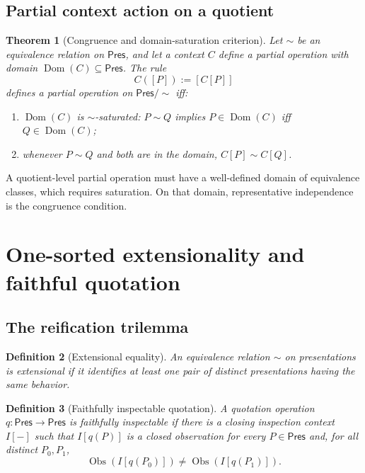 \documentclass[12pt,a4paper,twoside]{extarticle}
\makeatletter
\theoremstyle{compactplain}
\newtheorem{theorem}{Theorem}[section]
\theoremstyle{compactdef}
\newtheorem{definition}[theorem]{Definition}
\renewenvironment{proof}[1][\proofname]{\par\pushQED{\qed}\normalfont
  \topsep2pt\trivlist\item[\hskip\labelsep\bfseries #1\@addpunct{.}]\ignorespaces}
 {\popQED\endtrivlist\@endpefalse}
\newcommand{\Pres}{\mathsf{Pres}}
\newcommand{\blank}{[-]}
\makeatother
\begin{document}
\subsection{Partial context action on a quotient}
\begin{theorem}[Congruence and domain-saturation criterion]\label{thm:partial-congruence}
Let $\sim$ be an equivalence relation on $\Pres$, and let a context $C$ define a partial operation with domain $\operatorname{Dom}(C)\subseteq\Pres$. The rule
\[
C([P]):=[C[P]]
\]
defines a partial operation on $\Pres/{\sim}$ iff:
\begin{enumerate}
\item $\operatorname{Dom}(C)$ is $\sim$-saturated: $P\sim Q$ implies $P\in\operatorname{Dom}(C)$ iff $Q\in\operatorname{Dom}(C)$;
\item whenever $P\sim Q$ and both are in the domain, $C[P]\sim C[Q]$.
\end{enumerate}
\end{theorem}
\begin{proof}
A quotient-level partial operation must have a well-defined domain of equivalence classes, which requires saturation. On that domain, representative independence is the congruence condition.
\end{proof}
\section{One-sorted extensionality and faithful quotation}\label{sec:one-sorted}

\subsection{The reification trilemma}
\begin{definition}[Extensional equality]
An equivalence relation $\sim$ on presentations is extensional if it identifies at least one pair of distinct presentations having the same behavior.
\end{definition}

\begin{definition}[Faithfully inspectable quotation]
A quotation operation $q:\Pres\to\Pres$ is faithfully inspectable if there is a closing inspection context $I\blank$ such that $I[q(P)]$ is a closed observation for every $P\in\Pres$ and, for all distinct $P_0,P_1$,
\[
\operatorname{Obs}(I[q(P_0)])\ne\operatorname{Obs}(I[q(P_1)]).
\]
\end{definition}
\end{document}
